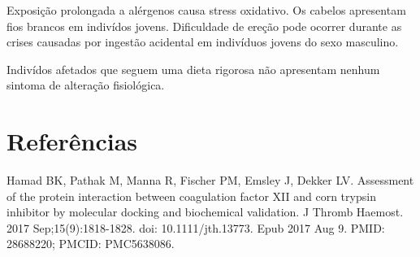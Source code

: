 \documentclass{article}
\begin{document}
Exposição prolongada a alérgenos causa stress oxidativo. Os cabelos
apresentam fios brancos em indivídos jovens. Dificuldade de ereção pode
ocorrer durante as crises causadas por ingestão acidental em indivíduos
jovens do sexo masculino.

Indivídos afetados que seguem uma dieta rigorosa não apresentam nenhum
sintoma de alteração fisiológica.

\section{Referências}

Hamad BK, Pathak M, Manna R, Fischer PM, Emsley J, Dekker LV. Assessment of the protein interaction between coagulation factor XII and corn trypsin inhibitor by molecular docking and biochemical validation. J Thromb Haemost. 2017 Sep;15(9):1818-1828. doi: 10.1111/jth.13773. Epub 2017 Aug 9. PMID: 28688220; PMCID: PMC5638086.
\end{document}
